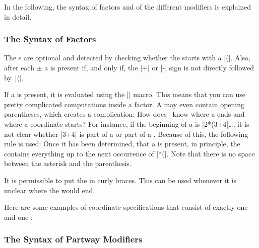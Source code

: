 In the following, the syntax of factors and of the different modifiers
is explained in detail.


\subsubsection{The Syntax of Factors}

The s are optional and detected by checking whether the
 starts with a |(|. Also, after each $\pm$ a
 is present if, and only if, the |+| or |-| sign is not directly
followed by~|(|.

If a  is present, it is evaluated using the |\pgfmathparse| macro.
This means that you can use pretty complicated computations inside a factor. A
 may even contain opening parentheses, which creates a
complication: How does \tikzname\ know where a  ends and where a
coordinate starts? For instance, if the beginning of a  is |2*(3+4|\dots, it is not clear whether |3+4| is part of a
 or part of a . Because of this, the following
rule is used: Once it has been determined, that a  is present, in
principle, the  contains everything up to the next occurrence of
|*(|. Note that there is no space between the asterisk and the parenthesis.

It is permissible to put the  in curly braces. This can be used
whenever it is unclear where the  would end.

Here are some examples of coordinate specifications that consist of exactly one
 and one :
%
\begin{codeexample}[preamble={\usetikzlibrary{calc}}]
\end{codeexample}


\subsubsection{The Syntax of Partway Modifiers}

